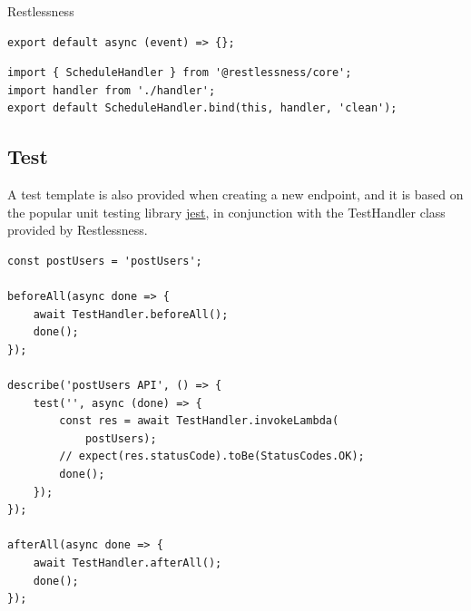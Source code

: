 \begin{chapter}{Restlessness}
    \bigskip
    \begin{lstlisting}[caption=handler.ts content, label={lst:sched_handler_ts}]
export default async (event) => {};
    \end{lstlisting}

    \bigskip
    \begin{lstlisting}[caption=index.ts content, label={lst:sched_index_ts}]
import { ScheduleHandler } from '@restlessness/core';
import handler from './handler';
export default ScheduleHandler.bind(this, handler, 'clean');
    \end{lstlisting}

    \subsection{Test}
    A test template is also provided when creating a new endpoint, and it is based
    on the popular unit testing library \href{https://jestjs.io/}{jest}, in
    conjunction with the TestHandler class provided by Restlessness.

    \bigskip
    \begin{lstlisting}[caption=index.test.ts template, label={lst:endopints_test_ts}]
const postUsers = 'postUsers';

beforeAll(async done => {
    await TestHandler.beforeAll();
    done();
});

describe('postUsers API', () => {
    test('', async (done) => {
        const res = await TestHandler.invokeLambda(
            postUsers);
        // expect(res.statusCode).toBe(StatusCodes.OK);
        done();
    });
});

afterAll(async done => {
    await TestHandler.afterAll();
    done();
});
    \end{lstlisting}

\end{chapter}